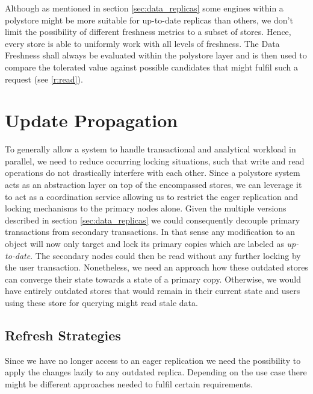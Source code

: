 Although as mentioned in section \ref{sec:data_replicas} some engines within a polystore might be more suitable for up-to-date replicas than others,
we don't limit the possibility of different freshness metrics to a subset of stores. Hence, every store is able to uniformly work with all levels of freshness.
The Data Freshness shall always be evaluated within the polystore layer and is then used to compare the tolerated value against possible candidates that might fulfil such a request 
(see \ref{r:read}).







\section{Update Propagation}
\label{sec:propagation}

To generally allow a system to handle transactional and analytical workload in parallel, we need to reduce occurring locking situations,
such that write and read operations do not drastically interfere with each other.
Since a polystore system acts as an abstraction layer on top of the encompassed stores, we can leverage it to act as a coordination service 
allowing us to restrict the eager replication and locking mechanisms to the primary nodes alone.
Given the multiple versions described in section \ref{sec:data_replicas} we could consequently decouple primary transactions from 
secondary transactions. In that sense any modification to an object will now only target and lock its primary copies which are labeled as \emph{up-to-date}.
The secondary nodes could then be read without any further locking by the user transaction. 
Nonetheless, we need an approach how these outdated stores can converge their state towards a state of a primary copy.
Otherwise, we would have entirely outdated stores that would remain in their current state and users using these store for querying might read stale data. 


\subsection{Refresh Strategies}
\label{sec:refresh_strategies}

Since we have no longer access to an eager replication we need the possibility to apply the changes lazily to any outdated replica.
Depending on the use case there might be different approaches needed to fulfil certain requirements.

